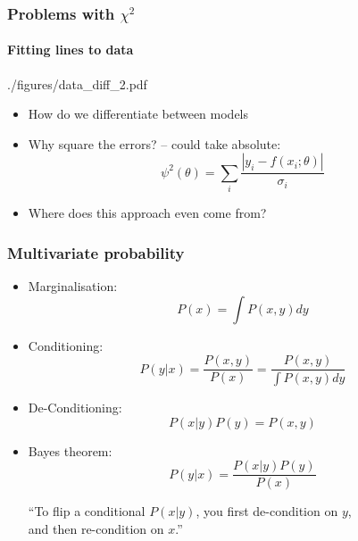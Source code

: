 \documentclass[%
]{beamer}
\begin{document}
\begin{frame}
    \frametitle{Problems with $\chi^2$}
    \framesubtitle{Fitting lines to data}
    \begin{figright}[0.4]{./figures/data_diff_2.pdf}
        \begin{itemize}
            \item How do we differentiate between models
            \item Why square the errors? -- could take absolute:
                \[
                    \psi^2(\theta) = \sum_i \frac{\left|y_i - f(x_i;\theta)\right|}{\sigma_i}
                \]
            \item Where does this approach even come from?
        \end{itemize}
    \end{figright}
\end{frame}

\begin{frame}
    \frametitle{Multivariate probability}
    \begin{itemize}
        \item Marginalisation:
            \begin{equation*}
                P(x) = \int P(x,y) dy
            \end{equation*}
        \item Conditioning:
            \begin{equation*}
                P(y|x) = \frac{P(x,y)}{P(x)} = \frac{P(x,y)}{\int P(x,y) dy}
            \end{equation*}
        \item De-Conditioning:
            \begin{equation*}
                P(x|y) P(y) = P(x,y)
            \end{equation*}
        \item Bayes theorem:
            \begin{equation*}
                P(y|x) = \frac{P(x|y) P(y)}{P(x)}
            \end{equation*}
            \begin{center}
                ``To flip a conditional $P(x|y)$, you first de-condition on $y$,\\ and then re-condition on $x$.''
            \end{center}
    \end{itemize}
\end{frame}
\end{document}
